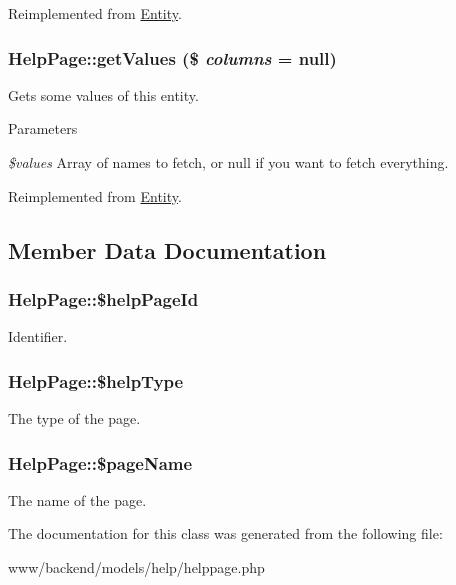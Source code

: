 Reimplemented from \hyperlink{classEntity_a8305fd94740ac62cbafb9de76567ce37}{Entity}.

\hypertarget{classHelpPage_ac4e71d65d287b8e0c1a48a298ccbcd01}{
\subsubsection[{getValues}]{\setlength{\rightskip}{0pt plus 5cm}HelpPage::getValues (\$ {\em columns} = {\ttfamily null})}}
\label{classHelpPage_ac4e71d65d287b8e0c1a48a298ccbcd01}
Gets some values of this entity.


\begin{DoxyParams}{Parameters}
\item[{\em \$values}]Array of names to fetch, or null if you want to fetch everything. \end{DoxyParams}


Reimplemented from \hyperlink{classEntity_aec1be209327cfcf2dc528a3a565a7a5f}{Entity}.



\subsection{Member Data Documentation}
\hypertarget{classHelpPage_a888d439b8b0c556098a7819d8fa2c94c}{
\subsubsection[{\$helpPageId}]{\setlength{\rightskip}{0pt plus 5cm}HelpPage::\$helpPageId}}
\label{classHelpPage_a888d439b8b0c556098a7819d8fa2c94c}
Identifier. \hypertarget{classHelpPage_a9c1a900e5bbdeaa7ee36e408fe5b82a3}{
\subsubsection[{\$helpType}]{\setlength{\rightskip}{0pt plus 5cm}HelpPage::\$helpType}}
\label{classHelpPage_a9c1a900e5bbdeaa7ee36e408fe5b82a3}
The type of the page. \hypertarget{classHelpPage_ac4837216da4af2d7d266efd4767a147c}{
\subsubsection[{\$pageName}]{\setlength{\rightskip}{0pt plus 5cm}HelpPage::\$pageName}}
\label{classHelpPage_ac4837216da4af2d7d266efd4767a147c}
The name of the page. 

The documentation for this class was generated from the following file:\begin{DoxyCompactItemize}
\item 
www/backend/models/help/helppage.php\end{DoxyCompactItemize}
